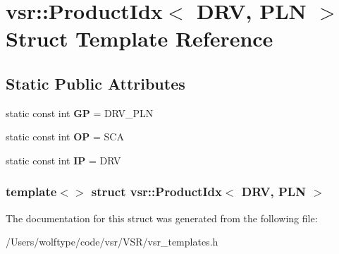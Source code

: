 \hypertarget{structvsr_1_1_product_idx_3_01_d_r_v_00_01_p_l_n_01_4}{\section{vsr\-:\-:Product\-Idx$<$ D\-R\-V, P\-L\-N $>$ Struct Template Reference}
\label{structvsr_1_1_product_idx_3_01_d_r_v_00_01_p_l_n_01_4}
}
\subsection*{Static Public Attributes}
\begin{DoxyCompactItemize}
\item 
\hypertarget{structvsr_1_1_product_idx_3_01_d_r_v_00_01_p_l_n_01_4_a9b8114e3dcdcc646d83129451b7bb819}{static const int {\bfseries G\-P} = D\-R\-V\-\_\-\-P\-L\-N}\label{structvsr_1_1_product_idx_3_01_d_r_v_00_01_p_l_n_01_4_a9b8114e3dcdcc646d83129451b7bb819}

\item 
\hypertarget{structvsr_1_1_product_idx_3_01_d_r_v_00_01_p_l_n_01_4_ad4578943424b1fc0721ec2bc309ec28c}{static const int {\bfseries O\-P} = S\-C\-A}\label{structvsr_1_1_product_idx_3_01_d_r_v_00_01_p_l_n_01_4_ad4578943424b1fc0721ec2bc309ec28c}

\item 
\hypertarget{structvsr_1_1_product_idx_3_01_d_r_v_00_01_p_l_n_01_4_a53f08dae043c90b7bbc8e1029dafe441}{static const int {\bfseries I\-P} = D\-R\-V}\label{structvsr_1_1_product_idx_3_01_d_r_v_00_01_p_l_n_01_4_a53f08dae043c90b7bbc8e1029dafe441}

\end{DoxyCompactItemize}
\subsubsection*{template$<$$>$ struct vsr\-::\-Product\-Idx$<$ D\-R\-V, P\-L\-N $>$}



The documentation for this struct was generated from the following file\-:\begin{DoxyCompactItemize}
\item 
/\-Users/wolftype/code/vsr/\-V\-S\-R/vsr\-\_\-templates.\-h\end{DoxyCompactItemize}
